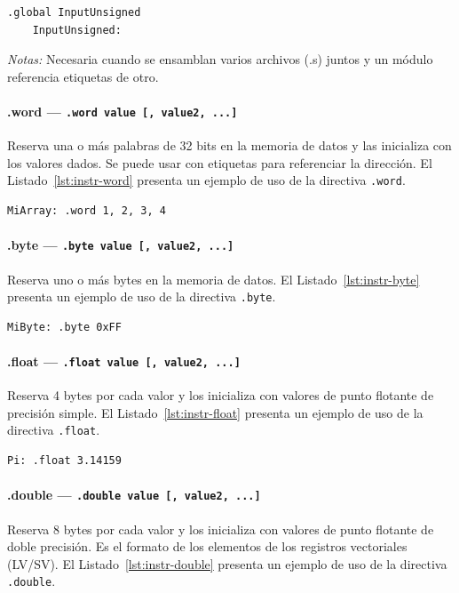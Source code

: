 \documentclass[../main.tex]{subfiles}
\begin{document}
\begin{lstlisting}[caption={.global},label={lst:instr-global}]
	.global InputUnsigned
	InputUnsigned:
\end{lstlisting}
\textit{Notas:} Necesaria cuando se ensamblan varios archivos (.s) juntos y un módulo referencia etiquetas de otro.

\paragraph*{.word --- \texttt{.word value [, value2, ...]}}
Reserva una o más palabras de 32 bits en la memoria de datos y las inicializa con los valores dados. Se puede usar con etiquetas para referenciar la dirección.
El Listado~\ref{lst:instr-word} presenta un ejemplo de uso de la directiva \texttt{.word}.

\begin{lstlisting}[caption={.word},label={lst:instr-word}]
	MiArray: .word 1, 2, 3, 4
\end{lstlisting}

\paragraph*{.byte --- \texttt{.byte value [, value2, ...]}}
Reserva uno o más bytes en la memoria de datos.
El Listado~\ref{lst:instr-byte} presenta un ejemplo de uso de la directiva \texttt{.byte}.

\begin{lstlisting}[caption={.byte},label={lst:instr-byte}]
	MiByte: .byte 0xFF
\end{lstlisting}

\paragraph*{.float --- \texttt{.float value [, value2, ...]}}
Reserva 4 bytes por cada valor y los inicializa con valores de punto flotante de precisión simple.
El Listado~\ref{lst:instr-float} presenta un ejemplo de uso de la directiva \texttt{.float}.

\begin{lstlisting}[caption={.float},label={lst:instr-float}]
	Pi: .float 3.14159
\end{lstlisting}

\paragraph*{.double --- \texttt{.double value [, value2, ...]}}
Reserva 8 bytes por cada valor y los inicializa con valores de punto flotante de doble precisión. Es el formato de los elementos de los registros vectoriales (LV/SV).
El Listado~\ref{lst:instr-double} presenta un ejemplo de uso de la directiva \texttt{.double}.
\end{document}
